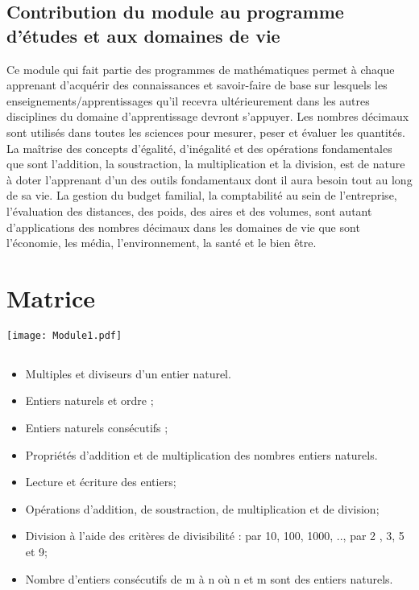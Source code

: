\subsection{Contribution du module au programme d'études et aux domaines de vie}
Ce module qui fait partie des programmes de mathématiques permet à chaque apprenant d'acquérir des connaissances et savoir-faire de base sur lesquels les
enseignements/apprentissages qu'il recevra ultérieurement dans les autres disciplines du domaine d'apprentissage devront s'appuyer. Les nombres décimaux sont
utilisés dans toutes les sciences pour mesurer, peser et évaluer les quantités.\\
La maîtrise des concepts d'égalité, d'inégalité et des opérations fondamentales que sont l'addition, la soustraction, la multiplication et la division, est de nature à
doter l'apprenant d'un des outils fondamentaux dont il aura besoin tout au long de sa vie. La gestion du budget familial, la comptabilité au sein de l'entreprise,
l'évaluation des distances, des poids, des aires et des volumes, sont autant d'applications des nombres décimaux dans les domaines de vie que sont l'économie, les
média, l'environnement, la santé et le bien être.

\section{Matrice}


\texttt{[image: Module1.pdf]} 

\subsection*{}

\savoir
\begin{itemize}
\item Multiples et diviseurs d'un entier naturel.
\item Entiers naturels et ordre ;
\item Entiers naturels consécutifs ;
\item Propriétés d'addition et de multiplication des nombres entiers naturels.
\end{itemize}
\savoirfaire
\begin{itemize}
\item Lecture et écriture des entiers;
\item Opérations d'addition, de soustraction, de multiplication et de division;
\item Division à l'aide des critères de divisibilité : par 10, 100, 1000, .., par 2 , 3, 5 et  9;
\item Nombre d'entiers consécutifs de m à n où n et m sont des entiers naturels.
\end{itemize}

